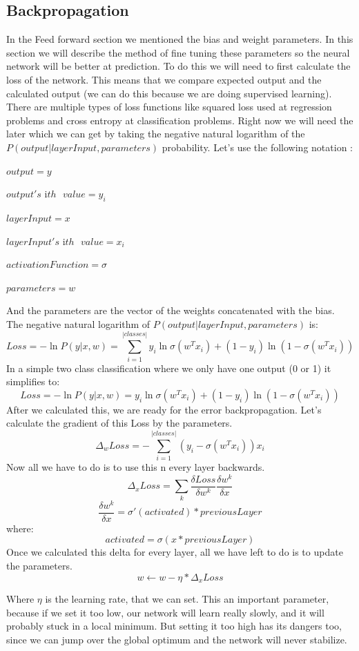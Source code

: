 \subsection{Backpropagation}
In the Feed forward section we mentioned the bias and weight parameters. In this section we will describe the method of fine tuning these parameters so the neural network will be better at prediction.
To do this we will need to first calculate the loss of the network. This means that we compare expected output and the calculated output (we can do this because we are doing supervised learning). There are multiple types of loss functions like squared loss used at regression problems and cross entropy at classification problems. Right now we will need the later which we can get by taking the negative natural logarithm of the \(P(output|layerInput, parameters)\) probability.
Let's use the following notation :

\(output = y\)

\(output's \text{ i}th \text{ } value = y_i\)

\(layerInput = x\)

\(layerInput's \text{ i}th \text{ } value = x_i\)

\(activationFunction = \sigma\)

\(parameters = w\)

And the parameters are the vector of the weights concatenated with the bias.
The negative natural logarithm of \(P(output|layerInput, parameters)\) is:
\[Loss = -\ln P(y|x, w) = \sum_{i=1}^{|classes|}y_i\ln \sigma(w^Tx_i)+(1 - y_i)\ln (1 - \sigma(w^Tx_i))\]
In a simple two class classification where we only have one output (0 or 1) it simplifies to:
\[Loss = -\ln P(y|x, w) = y_i\ln \sigma(w^Tx_i)+(1 - y_i)\ln (1 - \sigma(w^Tx_i))\]
After we calculated this, we are ready for the error backpropagation. Let's calculate the gradient of this Loss by the parameters.
\[\Delta_w Loss = -\sum_{i=1}^{|classes|}(y_i - \sigma(w^Tx_i))x_i\]
Now all we have to do is to use this n every layer backwards.
\[\Delta_x Loss = \sum_{k} \frac{\delta Loss}{\delta w^k}\frac{\delta w^k}{\delta x}\]
\[\frac{\delta w^k}{\delta x} = \sigma'(activated)*previousLayer\]
where:
\[activated = \sigma(x * previousLayer)\]
Once we calculated this delta for every layer, all we have left to do is to update the parameters.
\[w \leftarrow w - \eta * \Delta_x Loss\]

Where \(\eta\) is the learning rate, that we can set. This an important parameter, because if we set it too low, our network will learn really slowly, and it will probably stuck in a local minimum. But setting it too high has its dangers too, since we can jump over the global optimum and the network will never stabilize.

